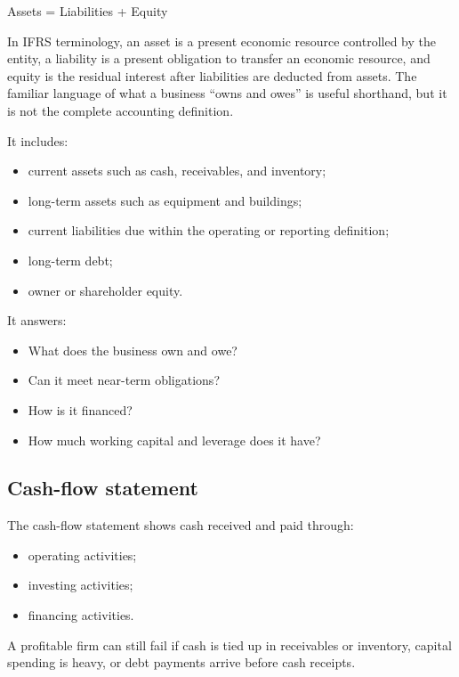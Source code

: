 \documentclass[11pt,letterpaper,oneside,openany]{book}
\begin{document}
\begin{guidequote}
Assets = Liabilities + Equity

\end{guidequote}


In IFRS terminology, an asset is a present economic resource controlled by the entity, a liability is a present obligation to transfer an economic resource, and equity is the residual interest after liabilities are deducted from assets. The familiar language of what a business ``owns and owes'' is useful shorthand, but it is not the complete accounting definition.


It includes:


\begin{itemize}
\item current assets such as cash, receivables, and inventory;
\item long-term assets such as equipment and buildings;
\item current liabilities due within the operating or reporting definition;
\item long-term debt;
\item owner or shareholder equity.
\end{itemize}


It answers:


\begin{itemize}
\item What does the business own and owe?
\item Can it meet near-term obligations?
\item How is it financed?
\item How much working capital and leverage does it have?
\end{itemize}


\subsection[Cash-flow statement]{Cash-flow statement}
The cash-flow statement shows cash received and paid through:


\begin{itemize}
\item operating activities;
\item investing activities;
\item financing activities.
\end{itemize}


A profitable firm can still fail if cash is tied up in receivables or inventory, capital spending is heavy, or debt payments arrive before cash receipts.
\end{document}
